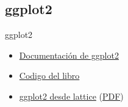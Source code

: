 \documentclass[xcolor={usenames,svgnames,dvipsnames}]{beamer}
\begin{document}
\subsection{ggplot2}
\label{sec-2-2}

\begin{frame}[label=sec-2-2-1]{ggplot2}
\begin{itemize}
\item \href{http://docs.ggplot2.org/current/}{Documentación de ggplot2}
\item \href{http://ggplot2.org/book/}{Codigo del libro}
\item \href{http://learnr.wordpress.com/2009/06/28/ggplot2-version-of-figures-in-lattice-multivariate-data-visualization-with-r-part-1/}{ggplot2 desde lattice} (\href{http://learnr.files.wordpress.com/2009/08/latbook.pdf}{PDF})
\end{itemize}
\end{frame}
\end{document}
